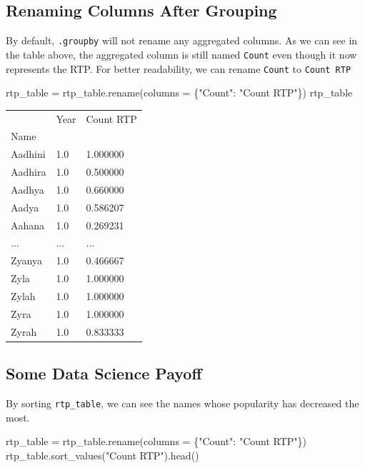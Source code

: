 \documentclass[
  letterpaper,
  DIV=11,
  numbers=noendperiod]{scrreprt}
\newenvironment{Shaded}{\begin{snugshade}}{\end{snugshade}}
\newcommand{\NormalTok}[1]{\textcolor[rgb]{0.00,0.23,0.31}{#1}}
\newcommand{\OperatorTok}[1]{\textcolor[rgb]{0.37,0.37,0.37}{#1}}
\newcommand{\StringTok}[1]{\textcolor[rgb]{0.13,0.47,0.30}{#1}}
\begin{document}
\subsection{Renaming Columns After
Grouping}\label{renaming-columns-after-grouping}

By default, \texttt{.groupby} will not rename any aggregated columns. As
we can see in the table above, the aggregated column is still named
\texttt{Count} even though it now represents the RTP. For better
readability, we can rename \texttt{Count} to \texttt{Count\ RTP}

\begin{Shaded}
\begin{Highlighting}[]
\NormalTok{rtp\_table }\OperatorTok{=}\NormalTok{ rtp\_table.rename(columns }\OperatorTok{=}\NormalTok{ \{}\StringTok{"Count"}\NormalTok{: }\StringTok{"Count RTP"}\NormalTok{\})}
\NormalTok{rtp\_table}
\end{Highlighting}
\end{Shaded}

\begin{longtable}[]{@{}lll@{}}
\toprule\noalign{}
& Year & Count RTP \\
Name & & \\
\midrule\noalign{}
\endhead
\bottomrule\noalign{}
\endlastfoot
Aadhini & 1.0 & 1.000000 \\
Aadhira & 1.0 & 0.500000 \\
Aadhya & 1.0 & 0.660000 \\
Aadya & 1.0 & 0.586207 \\
Aahana & 1.0 & 0.269231 \\
... & ... & ... \\
Zyanya & 1.0 & 0.466667 \\
Zyla & 1.0 & 1.000000 \\
Zylah & 1.0 & 1.000000 \\
Zyra & 1.0 & 1.000000 \\
Zyrah & 1.0 & 0.833333 \\
\end{longtable}

\subsection{Some Data Science Payoff}\label{some-data-science-payoff}

By sorting \texttt{rtp\_table}, we can see the names whose popularity
has decreased the most.

\begin{Shaded}
\begin{Highlighting}[]
\NormalTok{rtp\_table }\OperatorTok{=}\NormalTok{ rtp\_table.rename(columns }\OperatorTok{=}\NormalTok{ \{}\StringTok{"Count"}\NormalTok{: }\StringTok{"Count RTP"}\NormalTok{\})}
\NormalTok{rtp\_table.sort\_values(}\StringTok{"Count RTP"}\NormalTok{).head()}
\end{Highlighting}
\end{Shaded}
\end{document}
